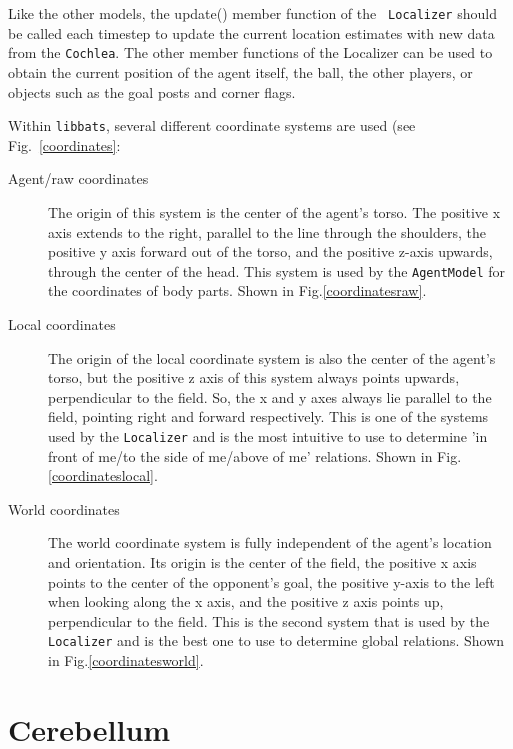 Like the other models, the update() member function of the {\tt
  Localizer} should be called each timestep to update the current
location estimates with new data from the {\tt Cochlea}. The other
member functions of the Localizer can be used to obtain the current
position of the agent itself, the ball, the other players, or objects
such as the goal posts and corner flags.

Within {\tt libbats}, several different coordinate systems are used
(see Fig.~\ref{coordinates}:
\begin{description}
\item[Agent/raw coordinates] The origin of this system is the center
  of the agent's torso. The positive x axis extends to the right,
  parallel to the line through the shoulders, the positive y axis
  forward out of the torso, and the positive z-axis upwards, through
  the center of the head. This system is used by the {\tt AgentModel}
  for the coordinates of body parts. Shown in
  Fig.\ref{coordinatesraw}.
\item[Local coordinates] The origin of the local coordinate system is
  also the center of the agent's torso, but the positive z axis of
  this system always points upwards, perpendicular to the field. So,
  the x and y axes always lie parallel to the field, pointing right
  and forward respectively. This is one of the systems used by the
  {\tt Localizer} and is the most intuitive to use to determine 'in
  front of me/to the side of me/above of me' relations. Shown in
  Fig.\ref{coordinateslocal}.
\item[World coordinates] The world coordinate system is fully
  independent of the agent's location and orientation. Its origin is
  the center of the field, the positive x axis points to the center of
  the opponent's goal, the positive y-axis to the left when looking
  along the x axis, and the positive z axis points up, perpendicular
  to the field. This is the second system that is used by the {\tt
    Localizer} and is the best one to use to determine global
  relations. Shown in Fig.\ref{coordinatesworld}.
\end{description}

\section{Cerebellum}
\label{secCerebellum}

